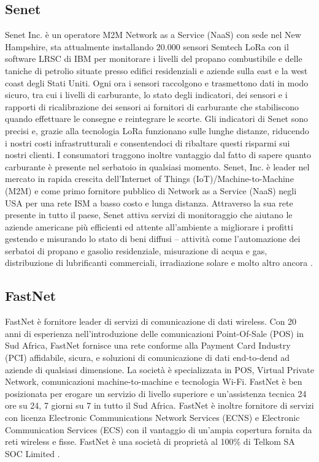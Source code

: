 \documentclass[a4paper]{report} %
\begin{document}
\subsection{Senet}
Senet Inc. è un operatore M2M Network as a Service (NaaS) con sede nel New Hampshire, sta attualmente installando 20.000 sensori Semtech LoRa con il software LRSC di IBM per monitorare i livelli del propano combustibile e delle taniche di petrolio situate presso edifici residenziali e aziende sulla east e la west coast degli Stati Uniti. Ogni ora i sensori raccolgono e trasmettono dati in modo sicuro, tra cui i livelli di carburante, lo stato degli indicatori, dei sensori e i rapporti di ricalibrazione dei sensori ai fornitori di carburante che stabiliscono quando effettuare le consegne e reintegrare le scorte. Gli indicatori di Senet sono precisi e, grazie alla tecnologia LoRa funzionano sulle lunghe distanze, riducendo i nostri costi infrastrutturali e consentendoci di ribaltare questi risparmi sui nostri clienti. I consumatori traggono inoltre vantaggio dal fatto di sapere quanto carburante è presente nel serbatoio in qualsiasi momento.
Senet, Inc. è leader nel mercato in rapida crescita dell'Internet of Things (IoT)/Machine-to-Machine (M2M) e come primo fornitore pubblico di Network as a Service (NaaS) negli USA per una rete ISM a basso costo e lunga distanza. Attraverso la sua rete presente in tutto il paese, Senet attiva servizi di monitoraggio che aiutano le aziende americane più efficienti ed attente all'ambiente a migliorare i profitti gestendo e misurando lo stato di beni diffusi -- attività come l'automazione dei serbatoi di propano e gasolio residenziale, misurazione di acqua e gas, distribuzione di lubrificanti commerciali, irradiazione solare e molto altro ancora \cite{art:rif.26}.

\subsection{FastNet}
FastNet è fornitore leader di servizi di comunicazione di dati wireless. Con 20 anni di esperienza nell'introduzione delle comunicazioni Point-Of-Sale (POS) in Sud Africa, FastNet fornisce una rete conforme alla Payment Card Industry (PCI) affidabile, sicura, e soluzioni di comunicazione di dati end-to-dend ad aziende di qualsiasi dimensione. La società è specializzata in POS, Virtual Private Network, comunicazioni machine-to-machine e tecnologia Wi-Fi.
FastNet è ben posizionata per erogare un servizio di livello superiore e un'assistenza tecnica 24 ore su 24, 7 giorni su 7 in tutto il Sud Africa. FastNet è inoltre fornitore di servizi con licenza Electronic Communications Network Services (ECNS) e Electronic Communication Services (ECS) con il vantaggio di un'ampia copertura fornita da reti wireless e fisse.
FastNet è una società di proprietà al 100\% di Telkom SA SOC Limited \cite{art:rif.26}. 
\end{document}
